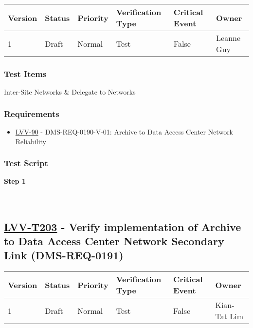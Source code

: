 \begin{longtable}[]{@{}llllll@{}}
\toprule
Version & Status & Priority & Verification Type & Critical Event &
Owner\tabularnewline
\midrule
\endhead
1 & Draft & Normal & Test & False & Leanne Guy\tabularnewline
\bottomrule
\end{longtable}

\hypertarget{test-items-178}{%
\subsubsection{Test Items}\label{test-items-178}}

Inter-Site Networks \& Delegate to Networks

\hypertarget{requirements-179}{%
\subsubsection{Requirements}\label{requirements-179}}

\begin{itemize}
\tightlist
\item
  \href{https://jira.lsstcorp.org/browse/LVV-90}{LVV-90} -
  DMS-REQ-0190-V-01: Archive to Data Access Center Network Reliability
\end{itemize}

\hypertarget{test-script-179}{%
\subsubsection{Test Script}\label{test-script-179}}

\textbf{Step 1}\\
~\\
~\\

\hypertarget{lvv-t203---verify-implementation-of-archive-to-data-access-center-network-secondary-link-dms-req-0191}{%
\subsection{\texorpdfstring{\href{https://jira.lsstcorp.org/secure/Tests.jspa\#/testCase/LVV-T203}{LVV-T203}
- Verify implementation of Archive to Data Access Center Network
Secondary Link
(DMS-REQ-0191)}{LVV-T203 - Verify implementation of Archive to Data Access Center Network Secondary Link (DMS-REQ-0191)}}\label{lvv-t203---verify-implementation-of-archive-to-data-access-center-network-secondary-link-dms-req-0191}}

\begin{longtable}[]{@{}llllll@{}}
\toprule
Version & Status & Priority & Verification Type & Critical Event &
Owner\tabularnewline
\midrule
\endhead
1 & Draft & Normal & Test & False & Kian-Tat Lim\tabularnewline
\bottomrule
\end{longtable}

